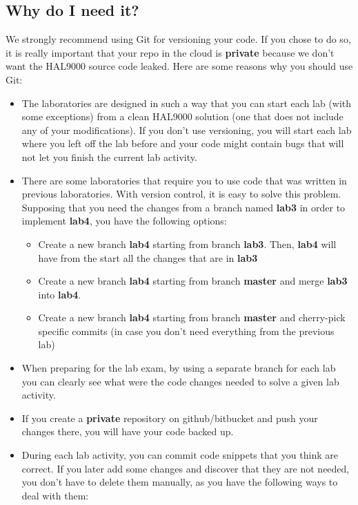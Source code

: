 \begin{appendices}
\subsection{Why do I need it?}
We strongly recommend using Git for versioning your code. If you chose to do so, it is really important that your repo in the cloud is \textbf{private} because we don't want the HAL9000 source code leaked.
Here are some reasons why you should use Git:
\begin{itemize}
	\item The laboratories are designed in such a way that you can start each lab (with some exceptions) from a clean HAL9000 solution (one that does not include any of your modifications). 
		 If you don't use versioning, you will start each lab where you left off the lab before and your code might contain bugs that will not let you finish the current lab activity.
        \item There are some laboratories that require you to use code that was written in previous laboratories. 
                With version control, it is easy to solve this problem. Supposing that you need the changes from a branch named \textbf{lab3} in order to implement \textbf{lab4}, you have the following options:
		\begin{itemize}
			\item Create a new branch \textbf{lab4} starting from branch \textbf{lab3}. Then, \textbf{lab4} will have from the start all the changes that are in \textbf{lab3}
			\item Create a new branch \textbf{lab4} starting from branch \textbf{master} and merge \textbf{lab3} into \textbf{lab4}.
			\item Create a new branch \textbf{lab4} starting from branch \textbf{master} and  cherry-pick specific commits (in case you don't need everything from the previous lab)
		\end{itemize}
	\item When preparing for the lab exam, by using a separate branch for each lab you can clearly see what were the code changes needed to solve a given lab activity.
	\item If you create a \textbf{private} repository on github/bitbucket and push your changes there, you will have your code backed up.
	\item During each lab activity, you can commit code snippets that you think are correct. If you later add some changes and discover that they are not needed, you don't have to delete them manually, as you have the following ways to deal with them:

\end{itemize}
\end{appendices}
